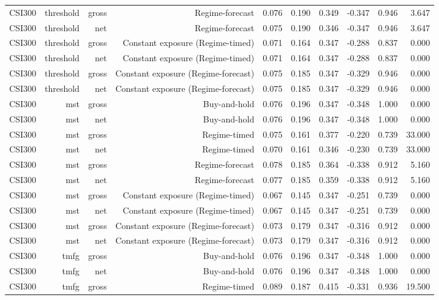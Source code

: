 \begin{tabular}{lrrrrrrrrr}
CSI300 & threshold & gross & Regime-forecast & 0.076 & 0.190 & 0.349 & -0.347 & 0.946 & 3.647 \\
CSI300 & threshold & net & Regime-forecast & 0.075 & 0.190 & 0.346 & -0.347 & 0.946 & 3.647 \\
CSI300 & threshold & gross & Constant exposure (Regime-timed) & 0.071 & 0.164 & 0.347 & -0.288 & 0.837 & 0.000 \\
CSI300 & threshold & net & Constant exposure (Regime-timed) & 0.071 & 0.164 & 0.347 & -0.288 & 0.837 & 0.000 \\
CSI300 & threshold & gross & Constant exposure (Regime-forecast) & 0.075 & 0.185 & 0.347 & -0.329 & 0.946 & 0.000 \\
CSI300 & threshold & net & Constant exposure (Regime-forecast) & 0.075 & 0.185 & 0.347 & -0.329 & 0.946 & 0.000 \\
CSI300 & mst & gross & Buy-and-hold & 0.076 & 0.196 & 0.347 & -0.348 & 1.000 & 0.000 \\
CSI300 & mst & net & Buy-and-hold & 0.076 & 0.196 & 0.347 & -0.348 & 1.000 & 0.000 \\
CSI300 & mst & gross & Regime-timed & 0.075 & 0.161 & 0.377 & -0.220 & 0.739 & 33.000 \\
CSI300 & mst & net & Regime-timed & 0.070 & 0.161 & 0.346 & -0.230 & 0.739 & 33.000 \\
CSI300 & mst & gross & Regime-forecast & 0.078 & 0.185 & 0.364 & -0.338 & 0.912 & 5.160 \\
CSI300 & mst & net & Regime-forecast & 0.077 & 0.185 & 0.359 & -0.338 & 0.912 & 5.160 \\
CSI300 & mst & gross & Constant exposure (Regime-timed) & 0.067 & 0.145 & 0.347 & -0.251 & 0.739 & 0.000 \\
CSI300 & mst & net & Constant exposure (Regime-timed) & 0.067 & 0.145 & 0.347 & -0.251 & 0.739 & 0.000 \\
CSI300 & mst & gross & Constant exposure (Regime-forecast) & 0.073 & 0.179 & 0.347 & -0.316 & 0.912 & 0.000 \\
CSI300 & mst & net & Constant exposure (Regime-forecast) & 0.073 & 0.179 & 0.347 & -0.316 & 0.912 & 0.000 \\
CSI300 & tmfg & gross & Buy-and-hold & 0.076 & 0.196 & 0.347 & -0.348 & 1.000 & 0.000 \\
CSI300 & tmfg & net & Buy-and-hold & 0.076 & 0.196 & 0.347 & -0.348 & 1.000 & 0.000 \\
CSI300 & tmfg & gross & Regime-timed & 0.089 & 0.187 & 0.415 & -0.331 & 0.936 & 19.500 \\

\end{tabular}
